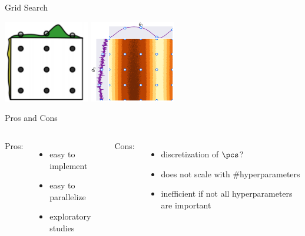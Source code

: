 \begin{frame}[c,fragile]{Grid Search }

\begin{center}
\includegraphics[width=0.28\textwidth]{images/grid_search}%
\includegraphics[width=0.28\textwidth]{images/gs}
\end{center}

\begin{block}{Pros and Cons}

\pause

\begin{columns}
Pros:
\begin{itemize}
  \item easy to implement
  \item easy to parallelize 
  \item exploratory studies
\end{itemize}

Cons:
\begin{itemize}
  \item discretization of $\pcs$?
  \item does not scale with $\#$hyperparameters
  \item inefficient if not all hyperparameters are important
\end{itemize}


\end{columns}

\end{block}

\end{frame}
